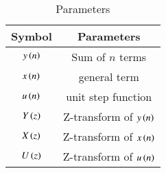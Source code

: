 \setlength{\arrayrulewidth}{0.3mm}
\setlength{\tabcolsep}{15pt}
\renewcommand{\arraystretch}{1.4}

\begin{table}[htbp]

\centering

\begin{tabular}{|c|c|}
\hline

\textbf{Symbol} & \textbf{Parameters}\\
\hline
$y\left(n\right)$ & Sum of $n$ terms\\
\hline
$x\left(n\right)$ & general term\\
\hline
$u\left(n\right)$ & unit step function\\
\hline
$Y\left(z\right)$ & Z-transform of $y\left(n\right)$\\
\hline
$X\left(z\right)$ & Z-transform of $x\left(n\right)$\\
\hline
$U\left(z\right)$ & Z-transform of $u\left(n\right)$\\
\hline

\end{tabular}
\vspace{0.25cm}
\caption{Parameters}
\label{tab:11.9.2.13.1}

\end{table}